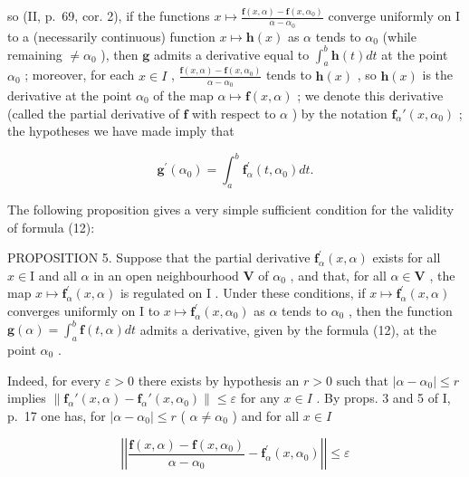 so (II, p.~69, cor. 2), if the functions \(x \mapsto \frac{\mathbf{f}(x, \alpha) - \mathbf{f}(x, \alpha_0)}{\alpha - \alpha_0}\) converge uniformly on I to a (necessarily continuous) function \(x \mapsto \mathbf{h}(x)\) as \(\alpha\) tends to \(\alpha_0\) (while remaining \(\neq \alpha_0\) ), then \(\mathbf{g}\) admits a derivative equal to \(\int_{a}^{b} \mathbf{h}(t) dt\) at the point \(\alpha_0\) ; moreover, for each \(x \in I\) , \(\frac{\mathbf{f}(x, \alpha) - \mathbf{f}(x, \alpha_0)}{\alpha - \alpha_0}\) tends to \(\mathbf{h}(x)\) , so \(\mathbf{h}(x)\) is the derivative at the point \(\alpha_0\) of the map \(\alpha \mapsto \mathbf{f}(x, \alpha)\) ; we denote this derivative (called the partial derivative of \(\mathbf{f}\) with respect to \(\alpha\) ) by the notation \(\mathbf{f}_{\alpha}'(x, \alpha_0)\) ; the hypotheses we have made imply that

\[
\mathbf {g} ^ {\prime} (\alpha_ {0}) = \int_ {a} ^ {b} \mathbf {f} _ {\alpha} ^ {\prime} (t, \alpha_ {0}) d t.\tag{12}
\]

The following proposition gives a very simple sufficient condition for the validity of formula (12):

PROPOSITION 5. Suppose that the partial derivative \(\mathbf{f}_{\alpha}^{\prime}(x,\alpha)\) exists for all \(x\in \mathrm{I}\) and all \(\alpha\) in an open neighbourhood \(\mathbf{V}\) of \(\alpha_0\) , and that, for all \(\alpha \in \mathbf{V}\) , the map \(x\mapsto \mathbf{f}_{\alpha}^{\prime}(x,\alpha)\) is regulated on \(\mathrm{I}\) . Under these conditions, if \(x\mapsto \mathbf{f}_{\alpha}^{\prime}(x,\alpha)\) converges uniformly on \(\mathrm{I}\) to \(x\mapsto \mathbf{f}_{\alpha}^{\prime}(x,\alpha_0)\) as \(\alpha\) tends to \(\alpha_0\) , then the function \(\mathbf{g}(\alpha) = \int_{a}^{b}\mathbf{f}(t,\alpha)dt\) admits a derivative, given by the formula (12), at the point \(\alpha_0\) .

Indeed, for every \(\varepsilon > 0\) there exists by hypothesis an \(r > 0\) such that \(|\alpha - \alpha_0| \leqslant r\) implies \(\left\| \mathbf{f}_{\alpha}'(x, \alpha) - \mathbf{f}_{\alpha}'(x, \alpha_0) \right\| \leqslant \varepsilon\) for any \(x \in I\) . By props. 3 and 5 of I, p.~17 one has, for \(|\alpha - \alpha_0| \leqslant r\) ( \(\alpha \neq \alpha_0\) ) and for all \(x \in I\)

\[
\left| \left| \frac {\mathbf {f} (x , \alpha) - \mathbf {f} (x , \alpha_ {0})}{\alpha - \alpha_ {0}} - \mathbf {f} _ {\alpha} ^ {\prime} (x, \alpha_ {0}) \right| \right| \leqslant \varepsilon
\]

